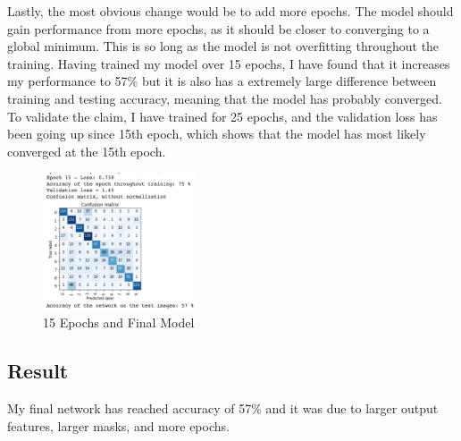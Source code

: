 \documentclass{article}
\begin{document}
    Lastly, the most obvious change would be to add more epochs. The model should gain performance from more epochs, as it should be closer to converging to a global minimum. This is so long as the model is not overfitting throughout the training. Having trained my model over 15 epochs, I have found that it increases my performance to 57\% but it is also has a extremely large difference between training and testing accuracy, meaning that the model has probably converged. To validate the claim, I have trained for 25 epochs, and the validation loss has been going up since 15th epoch, which shows that the model has most likely converged at the 15th epoch.

    \begin{figure}[h!]
        \centering
        \includegraphics[width=0.4\textwidth]{final}
        \caption{15 Epochs and Final Model}
    \end{figure}

    \subsection{Result}
    My final network has reached accuracy of 57\% and it was due to larger output features, larger masks, and more epochs.

    
    
\end{document}
